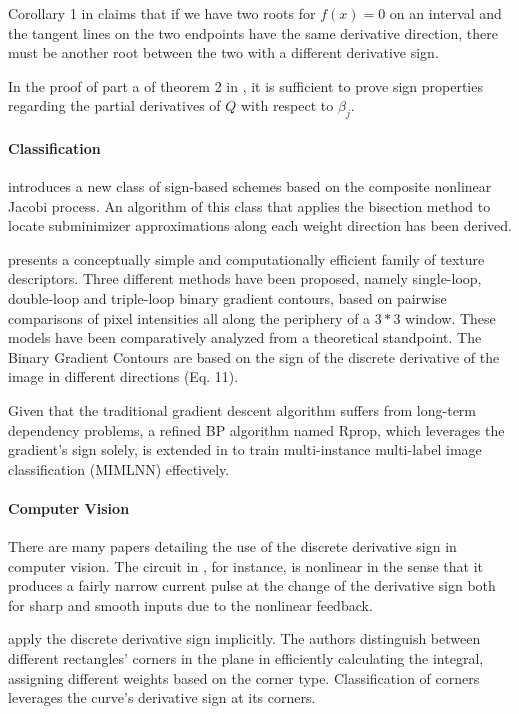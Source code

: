 \documentclass[11pt]{book}
\begin{document}
Corollary 1 in \cite{pan2020implicit} claims that if we have two
roots for $f\left(x\right)=0$ on an interval and the tangent lines
on the two endpoints have the same derivative direction, there must
be another root between the two with a different derivative sign.

In the proof of part a of theorem 2 in \cite{xue2020regularized},
it is sufficient to prove sign properties regarding the partial derivatives
of $Q$ with respect to $\beta_{j}$.

\paragraph{Classification}

\cite{anastasiadis2005sign} introduces a new class of sign-based
schemes based on the composite nonlinear Jacobi process. An algorithm
of this class that applies the bisection method to locate subminimizer
approximations along each weight direction has been derived.

\cite{fernandez2011image} presents a conceptually simple and computationally
efficient family of texture descriptors. Three different methods have
been proposed, namely single-loop, double-loop and triple-loop binary
gradient contours, based on pairwise comparisons of pixel intensities
all along the periphery of a $3*3$ window. These models have been
comparatively analyzed from a theoretical standpoint. The Binary Gradient
Contours are based on the sign of the discrete derivative of the image
in different directions (Eq. 11).

Given that the traditional gradient descent algorithm suffers from
long-term dependency problems, a refined BP algorithm named Rprop,
which leverages the gradient's sign solely, is extended in \cite{chen2013multi}
to train multi-instance multi-label image classification (MIMLNN)
effectively.

\paragraph{Computer Vision}

There are many papers detailing the use of the discrete derivative
sign in computer vision. The circuit in \cite{higgins2000modular},
for instance, is nonlinear in the sense that it produces a fairly
narrow current pulse at the change of the derivative sign both for
sharp and smooth inputs due to the nonlinear feedback.

\cite{viola2001rapid,wang2007shape} apply the discrete derivative
sign implicitly. The authors distinguish between different rectangles'
corners in the plane in efficiently calculating the integral, assigning
different weights based on the corner type. Classification of corners
leverages the curve's derivative sign at its corners.
\end{document}
